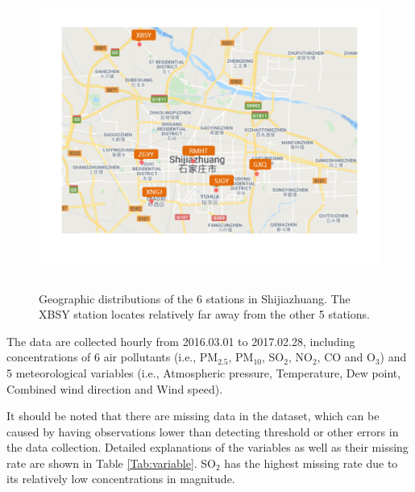 \documentclass[12pt]{article}
\numberwithin{equation}{section}
\begin{document}
\begin{figure}[htbp]
	\centering
	\includegraphics[width=15cm,height=10cm]{map.png}
	\caption{\footnotesize Geographic distributions of the 6 stations in Shijiazhuang. The XBSY station locates relatively far away from the other 5 stations.}
	\label{fig:map}
\end{figure}

The data are collected hourly from 2016.03.01 to 2017.02.28, including concentrations of 6 air pollutants (i.e., PM$_{2.5}$, PM$_{10}$, SO$_2$, NO$_2$, CO and O$_3$) and 5 meteorological variables (i.e., Atmospheric pressure, Temperature, Dew point, Combined wind direction and Wind speed). 

It should be noted that there are missing data in the dataset, which can be caused by having observations lower than detecting threshold or other errors in the data collection. Detailed explanations of the variables as well as their missing rate are shown in Table \ref{Tab:variable}. SO$_2$ has the highest missing rate due to its relatively low concentrations in magnitude.
\end{document}
